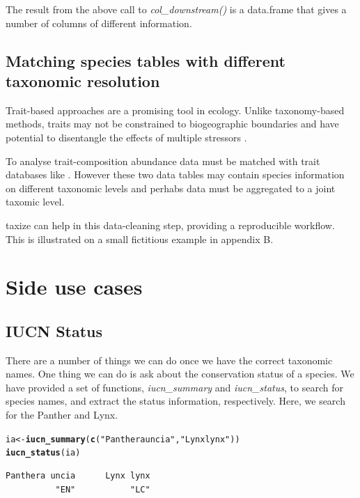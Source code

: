 \documentclass[letterpaper,superscriptaddress,showkeys,longbibliography,10pt]{revtex4-1}\usepackage{graphicx, color}
\makeatletter
\newcommand{\hlfunctioncall}[1]{\textcolor[rgb]{0.501960784313725,0,0.329411764705882}{\textbf{#1}}}%
\newcommand{\hlstring}[1]{\textcolor[rgb]{0.6,0.6,1}{#1}}%
\newenvironment{kframe}{%
 \def\at@end@of@kframe{}%
 \ifinner\ifhmode%
  \def\at@end@of@kframe{\end{minipage}}%
  \begin{minipage}{\columnwidth}%
 \fi\fi%
 \def\FrameCommand##1{\hskip\@totalleftmargin \hskip-\fboxsep
 \colorbox{shadecolor}{##1}\hskip-\fboxsep
     \hskip-\linewidth \hskip-\@totalleftmargin \hskip\columnwidth}%
 \MakeFramed {\advance\hsize-\width
   \@totalleftmargin\z@ \linewidth\hsize
   \@setminipage}}%
 {\par\unskip\endMakeFramed%
 \at@end@of@kframe}
\newenvironment{knitrout}{}{} %
\makeatother
\begin{document}
The result from the above call to \emph{col\_downstream()} is a data.frame that gives a number of columns of different information. 

\subsection{Matching species tables with different taxonomic resolution}

Trait-based approaches are a promising tool in ecology. Unlike taxonomy-based methods, traits may not be constrained to biogeographic boundaries \citep{baird_toward_2011} and have potential to disentangle the effects of multiple stressors \citep{statzner_can_2010}. 

To analyse trait-composition abundance data must be matched with trait databases like \citet{usseglio-polatera_biological_2000}. However these two data tables may contain species information on different taxonomic levels and perhabs data must be aggregated to a joint taxomic level.

taxize can help in this data-cleaning step, providing a reproducible workflow. This is illustrated on a small fictitious example in appendix B.



\section{Side use cases}
\subsection{IUCN Status}

There are a number of things we can do once we have the correct taxonomic names. One thing we can do is ask about the conservation status of a species. We have provided a set of functions, \emph{iucn\_summary} and \emph{iucn\_status}, to search for species names, and extract the status information, respectively. Here, we search for the Panther and Lynx.  

\begin{knitrout}
\color{fgcolor}\begin{kframe}
\begin{alltt}
ia <- \hlfunctioncall{iucn_summary}(\hlfunctioncall{c}(\hlstring{"Panthera uncia"}, \hlstring{"Lynx lynx"}))
\hlfunctioncall{iucn_status}(ia)
\end{alltt}
\begin{verbatim}
Panthera uncia      Lynx lynx 
          "EN"           "LC" 
\end{verbatim}
\end{kframe}
\end{knitrout}
\end{document}
